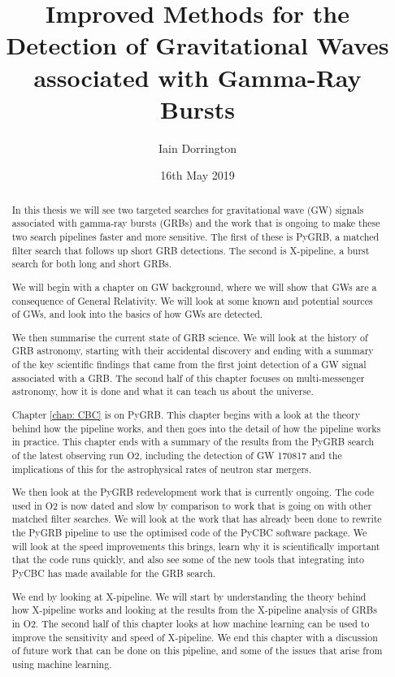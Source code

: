 \documentclass[11pt]{cuthesis}
\title{Improved Methods for the Detection of Gravitational Waves associated with Gamma-Ray Bursts}
\author{Iain Dorrington}
\date{16th May 2019}
\newcommand{\xp}{X-pipeline }
\begin{document}

\maketitle

\frontmatter

\begin{abstract}
In this thesis we will see two targeted searches for gravitational wave (GW) signals associated with gamma-ray bursts (GRBs) and the work that is ongoing to make these two search pipelines faster and more sensitive. The first of these is PyGRB, a matched filter search that follows up short GRB detections. The second is X-pipeline, a burst search for both long and short GRBs. 

We will begin with a chapter on GW background, where we will show that GWs are a consequence of General Relativity. We will look at some known and potential sources of GWs, and look into the basics of how GWs are detected. 

We then summarise the current state of GRB science. We will look at the history of GRB astronomy, starting with their accidental discovery and ending with a summary of the key scientific findings that came from the first joint detection of a GW signal associated with a GRB. The second half of this chapter focuses on multi-messenger astronomy, how it is done and what it can teach us about the universe.

Chapter \ref{chap: CBC} is on PyGRB. This chapter begins with a look at the theory behind how the pipeline works, and then goes into the detail of how the pipeline works in practice. This chapter ends with a summary of the results from the PyGRB search of the latest observing run O2, including the detection of GW 170817 and the implications of this for the astrophysical rates of neutron star mergers. 

We then look at the PyGRB redevelopment work that is currently ongoing. The code used in O2 is now dated and slow by comparison to work that is going on with other matched filter searches. We will look at the work that has already been done to rewrite the PyGRB pipeline to use the optimised code of the PyCBC software package. We will look at the speed improvements this brings, learn why it is scientifically important that the code runs quickly, and also see some of the new tools that integrating into PyCBC has made available for the GRB search. 

We end by looking at X-pipeline. We will start by understanding the theory behind how \xp works and looking at the results from the \xp analysis of GRBs in O2. The second half of this chapter looks at how machine learning can be used to improve the sensitivity and speed of X-pipeline. We end this chapter with a discussion of future work that can be done on this pipeline, and some of the issues that arise from using machine learning. 
\end{abstract}
\end{document}
